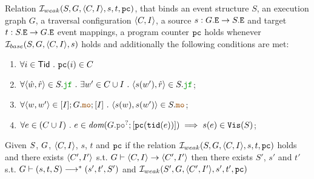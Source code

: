 \documentclass[12pt]{article}
\begin{document}
\begin{definition}
  Relation $\mathcal{I}_{weak}(S, G, \langle C, I \rangle, s, t, {\mathtt{pc}})$, that binds an 
  event structure $S$, an \imm execution graph $G$,
  a traversal configuration $\langle C, I \rangle$,
  a source $s : G.{\mathtt{E}} \rightarrow S.{\mathtt{E}}$ and target $t : S.{\mathtt{E}} \rightarrow G.{\mathtt{E}}$ event mappings,
  a program counter ${\mathtt{pc}}$
  holds whenever $\mathcal{I}_{base}(S, G, \langle C, I \rangle, s)$ holds and
  additionally the following conditions are met:
  \begin{enumerate}[label=\textbf{S.\arabic*},start=6]

    \item \label{item:sim-pc}
      $\forall{i \in \mathsf{Tid}} ~.~ {\mathtt{pc}}(i) \in C$



    


    \item \label{item:sim-jf}
      $
      \forall{\tup{\hat{w}, \hat{r}} \in \lES.\lJF} ~.~
      \exists{w' \in \lC \cup \lI} ~.~ \tup{s(w'), \hat{r}} \in \lES.\lJF
      $;



    \item \label{item:sim-mo}
      $\forall{\tup{w, w'} \in [\lI];\lG.\lMO;[\lI]} ~.~ \tup{s(w), s(w')} \in \lES.\lMO$;
      
    \item \label{item:sim-vis-weak}
      $\forall{e \in (C \cup I)} ~.~
      e \in \dom{G.\lPO^?;[\lPC(\lTID(e))]} \implies s(e) \in \lVIS(S)$;

  \end{enumerate}
\end{definition}


\begin{lemma}
  Given $S$, $G$, $\langle C, I \rangle$, $s$, $t$ and ${\mathtt{pc}}$
  if the relation $\mathcal{I}_{weak}(S, G, \langle C, I \rangle, s, t, {\mathtt{pc}})$ holds and 
  there exists $\langle C', I' \rangle$
  s.t. $G \vdash \langle C, I \rangle \rightarrow \langle C', I' \rangle$
  then there exists $S'$, $s'$ and $t'$ s.t. $G \vdash (s, t, S) \longrightarrow^* (s', t', S')$
  and $\mathcal{I}_{weak}(S', G, \langle C', I' \rangle, s', t', {\mathtt{pc}})$ 
\end{lemma}
\end{document}
